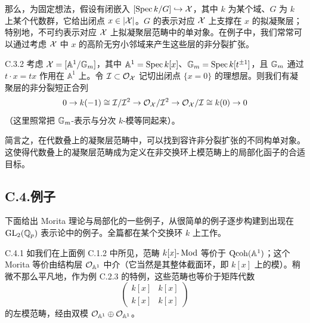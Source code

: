 那么，为固定想法，假设有闭嵌入 $[\operatorname{Spec} k/G]\hookrightarrow\mathcal{X}$，其中 $k$ 为某个域、$G$ 为 $k$ 上某个代数群，它给出闭点 $x\in|\mathcal{X}|$。$G$ 的表示对应 $\mathcal{X}$ 上支撑在 $x$ 的拟凝聚层；特别地，不可约表示对应 $\mathcal{X}$ 上拟凝聚层范畴中的单对象。在例子中，我们常常可以通过考虑 $\mathcal{X}$ 中 $x$ 的高阶无穷小邻域来产生这些层的非分裂扩张。


\begin{exam}{C.3.2}\label{thm:a4-19-7}
考虑 $\mathcal{X}=[\mathbb A^1/\mathbb{G}_m]$，其中 $\mathbb A^1=\operatorname{Spec} k[x]$、$\mathbb{G}_m=\operatorname{Spec} k[t^{\pm1}]$，且 $\mathbb{G}_m$ 通过 $t\cdot x=tx$ 作用在 $\mathbb A^1$ 上。令 $\mathcal I\subset\mathcal{O}_{\mathcal{X}}$ 记切出闭点 $\{x=0\}$ 的理想层。则我们有凝聚层的非分裂短正合列
\[
0\to k(-1)\cong\mathcal I/\mathcal I^2\to\mathcal{O}_{\mathcal{X}}/\mathcal I^2\to\mathcal{O}_{\mathcal{X}}/\mathcal I\cong k(0)\to0
\]
（这里照常把 $\mathbb{G}_m$-表示与分次 $k$-模等同起来）。
\end{exam}

简言之，在代数叠上的凝聚层范畴中，可以找到容许非分裂扩张的不同构单对象。这使得代数叠上的凝聚层范畴成为定义在非交换环上模范畴上的局部化函子的合适目标。

\subsection*{C.4.\quad 例子}

下面给出 Morita 理论与局部化的一些例子，从很简单的例子逐步构建到出现在 $\mathrm{GL}_2(\mathbb{Q}_p)$ 表示论中的例子。全篇都在某个交换环 $k$ 上工作。

\begin{exam}{C.4.1}\label{thm:a4-19-8}
如我们在上面例 C.1.2 中所见，范畴 $k[x]\text{-}\operatorname{Mod}$ 等价于 $\operatorname{Qcoh}(\mathbb A^1)$；这个 Morita 等价由结构层 $\mathcal{O}_{\mathbb A^1}$ 中介（它当然是其整体截面环，即 $k[x]$ 上的模）。稍微不那么平凡地，作为例 C.2.3 的特例，这些范畴也等价于矩阵代数
\[
\begin{pmatrix}k[x]&k[x]\\k[x]&k[x]\end{pmatrix}
\]
的左模范畴，经由双模 $\mathcal{O}_{\mathbb A^1}\oplus\mathcal{O}_{\mathbb A^1}$。
\end{exam}

